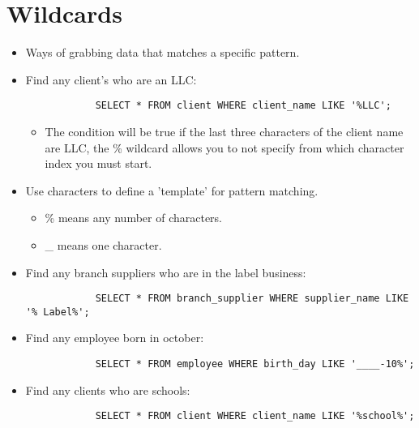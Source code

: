 \section{Wildcards}
\begin{itemize}
    \item Ways of grabbing data that matches a specific pattern.
    \item Find any client's who are an LLC:
        \begin{verbatim}
            SELECT * FROM client WHERE client_name LIKE '%LLC';
        \end{verbatim}
        \begin{itemize}
            \item The condition will be true if the last three characters of the client name are LLC, the \% wildcard allows you to not specify from which character index you must start.
        \end{itemize}
    
    \item Use characters to define a 'template' for pattern matching.
        \begin{itemize}
            \item \% means any number of characters.
            \item \_ means one character.
        \end{itemize}
    
    \item Find any branch suppliers who are in the label business:
        \begin{verbatim}
            SELECT * FROM branch_supplier WHERE supplier_name LIKE '% Label%';
        \end{verbatim}
    
    \item Find any employee born in october:
        \begin{verbatim}
            SELECT * FROM employee WHERE birth_day LIKE '____-10%';
        \end{verbatim}
    
    \item Find any clients who are schools:
        \begin{verbatim}
            SELECT * FROM client WHERE client_name LIKE '%school%';
        \end{verbatim}
\end{itemize}
